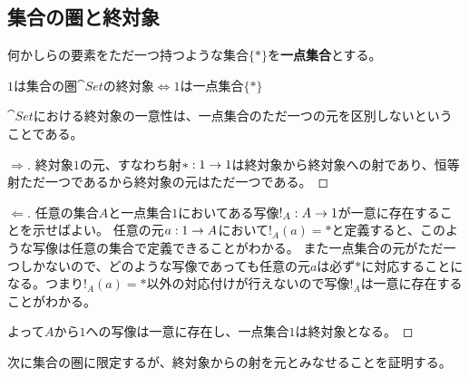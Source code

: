 \subsection{集合の圏と終対象}
	\begin{define}[一点集合]
		何かしらの要素をただ一つ持つような集合$\{*\}$を\textbf{一点集合}とする。
	\end{define}
	\begin{prop}[一点集合と終対象の同値性]
		$1$は集合の圏$\cat{Set}$の終対象$\iff 1$は一点集合$\{*\}$
	\end{prop}
  $\cat{Set}$における終対象の一意性は、一点集合のただ一つの元を区別しないということである。
	\begin{proof}[$\Longrightarrow$]
		終対象$1$の元、すなわち射$*:1\rightarrow 1$は終対象から終対象への射であり、恒等射ただ一つであるから終対象の元はただ一つである。
	\end{proof}
	\begin{proof}[$\Longleftarrow$]
		任意の集合$A$と一点集合$1$においてある写像$!_A:A\rightarrow 1$が一意に存在することを示せばよい。
		任意の元$a:1\rightarrow A$において$!_A(a)=*$と定義すると、このような写像は任意の集合で定義できることがわかる。
		また一点集合の元がただ一つしかないので、どのような写像であっても任意の元$a$は必ず$*$に対応することになる。つまり$!_A(a)=*$以外の対応付けが行えないので写像$!_A$は一意に存在することがわかる。

		よって$A$から$1$への写像は一意に存在し、一点集合$1$は終対象となる。
	\end{proof}
	次に集合の圏に限定するが、終対象からの射を元とみなせることを証明する。

